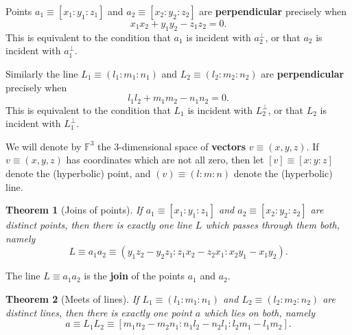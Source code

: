 \documentclass[11pt]{article}
\newtheorem{theorem}{Theorem}
\begin{document}
Points $a_{1}\equiv[x_{1}:y_{1}:z_{1}]$ and $a_{2}\equiv[x_{2}:y_{2}:z_{2}]$
are \textbf{perpendicular} precisely when 
\begin{equation*}
x_{1}x_{2}+y_{1}y_{2}-z_{1}z_{2}=0.
\end{equation*}
This is equivalent to the condition that $a_{1}$ is incident with $%
a_{2}^{\perp}$, or that $a_{2}$ is incident with $a_{1}^{\perp}$.\newline

Similarly the line $L_{1}\equiv(l_{1}:m_{1}:n_{1})$ and $L_{2}%
\equiv(l_{2}:m_{2}:n_{2})$ are \textbf{perpendicular} precisely when 
\begin{equation*}
l_{1}l_{2}+m_{1}m_{2}-n_{1}n_{2}=0.
\end{equation*}
This is equivalent to the condition that $L_{1}$ is incident with $%
L_{2}^{\perp}$, or that $L_{2}$ is incident with $L_{1}^{\perp}$.\newline

We will denote by $\mathbb{F}^{3}$ the 3-dimensional space of \textbf{vectors%
} $v\equiv(x,y,z)$. If $v\equiv(x,y,z)$ has coordinates which are not all
zero, then let $[v]\equiv[x:y:z]$ denote the (hyperbolic) point, and $%
(v)\equiv(l:m:n)$ denote the (hyperbolic) line.\newline

\begin{theorem}[Joins of points]
If $a_{1}\equiv[x_{1}:y_{1}:z_{1}]$ and $a_{2}\equiv[x_{2}:y_{2}:z_{2}]$ are
distinct points, then there is exactly one line $L$ which passes through
them both, namely 
\begin{equation*}
L\equiv
a_{1}a_{2}%
\equiv(y_{1}z_{2}-y_{2}z_{1}:z_{1}x_{2}-z_{2}x_{1}:x_{2}y_{1}-x_{1}y_{2}).
\end{equation*}
\end{theorem}

The line $L\equiv a_{1}a_{2}$ is the \textbf{join} of the points $a_{1}$ and 
$a_{2}$.\newline

\begin{theorem}[Meets of lines]
If $L_{1}\equiv(l_{1}:m_{1}:n_{1})$ and $L_{2}\equiv(l_{2}:m_{2}:n_{2})$ are
distinct lines, then there is exactly one point $a$ which lies on both,
namely 
\begin{equation*}
a\equiv L_{1}L_{2}\equiv[%
m_{1}n_{2}-m_{2}n_{1}:n_{1}l_{2}-n_{2}l_{1}:l_{2}m_{1}-l_{1}m_{2}].
\end{equation*}
\end{theorem}
\end{document}
